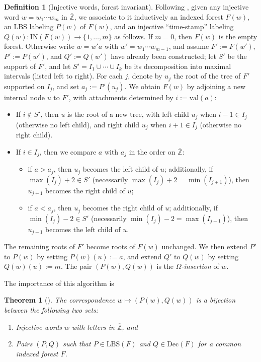 \documentclass[a4paper,fleqn]{cas-sc}
\newtheorem{theorem}{Theorem}[section]
\theoremstyle{definition}
\newtheorem{definition}[lemma]{Definition}
\theoremstyle{remark}
\numberwithin{equation}{subsection}
\begin{document}
\begin{definition}[Injective words, forest invariant]
Following \cite{nadeau2024forest}, given any injective word $w = w_1\cdots w_m$ in $\overline{\mathbb{Z}}$, we associate to it inductively an indexed forest $F(w)$, an LBS labeling $P(w)$ of $F(w)$, and an injective ``time-stamp'' labeling $Q(w):\mathrm{IN}(F(w))\to\{1,\ldots,m\}$ as follows. If $m=0$, then $F(w)$ is the empty forest. Otherwise write $w = w'a$ with $w' = w_1\cdots w_{m-1}$, and assume $F' := F(w')$, $P' := P(w')$, and $Q' := Q(w')$ have already been constructed; let $S'$ be the support of $F'$, and let $S' = I_1\cup\cdots\cup I_k$ be its decomposition into maximal intervals (listed left to right). For each $j$, denote by $u_j$ the root of the tree of $F'$ supported on $I_j$, and set $a_j := P'(u_j)$. We obtain $F(w)$ by adjoining a new internal node $u$ to $F'$, with attachments determined by $i := \mathrm{val}(a)$:
\begin{itemize}
\item If $i\notin S'$, then $u$ is the root of a new tree, with left child $u_j$ when $i-1\in I_j$ (otherwise no left child), and right child $u_j$ when $i+1\in I_j$ (otherwise no right child).
\item If $i\in I_j$, then we compare $a$ with $a_j$ in the order on $\overline{\mathbb{Z}}$:
\begin{itemize}
\item if $a>a_j$, then $u_j$ becomes the left child of $u$; additionally, if $\max(I_j)+2\in S'$ (necessarily $\max(I_j)+2 = \min(I_{j+1})$), then $u_{j+1}$ becomes the right child of $u$;
\item if $a<a_j$, then $u_j$ becomes the right child of $u$; additionally, if $\min(I_j)-2\in S'$ (necessarily $\min(I_j)-2=\max(I_{j-1})$), then $u_{j-1}$ becomes the left child of $u$.
\end{itemize}
\end{itemize}
The remaining roots of $F'$ become roots of $F(w)$ unchanged. We then extend $P'$ to $P(w)$ by setting $P(w)(u) := a$, and extend $Q'$ to $Q(w)$ by setting $Q(w)(u) := m$. The pair $(P(w), Q(w))$ is the \emph{$\Omega$-insertion} of $w$.
\end{definition}

The importance of this algorithm is

\begin{theorem}[{\cite[Theorem~5.1]{nadeau2024forest}}]
The correspondence $w\mapsto (P(w), Q(w))$ is a bijection between the following two sets:
\begin{enumerate}
\item Injective words $w$ with letters in $\overline{\mathbb{Z}}$, and
\item Pairs $(P, Q)$ such that $P \in \mathrm{LBS}(F)$ and $Q \in \mathrm{Dec}(F)$ for a common indexed forest $F$.
\end{enumerate}
\end{theorem}
\end{document}
